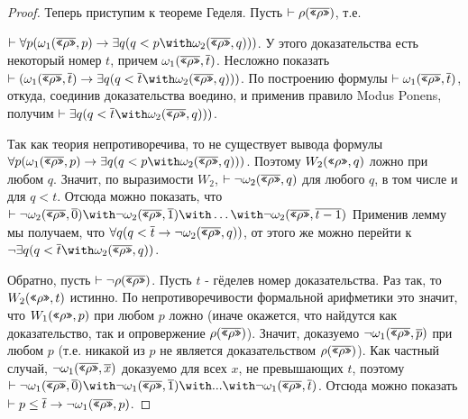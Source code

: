 \begin{proof}

Теперь приступим к теореме Геделя. Пусть $\vdash \rho(\overline{\texttt{<<}\rho\texttt{>>}})$, т.е.

$\vdash \forall p (\omega_1 (\overline{\gq\rho},p) \rightarrow \exists q (q < p \with \omega_2 (\overline{\gq\rho},q)))$.
У этого доказательства есть некоторый номер $t$, причем $\omega_1 (\overline{\texttt{<<}\rho\texttt{>>}},\overline{t})$.
Несложно показать $\vdash (\omega_1 (\overline{\gq\rho},\overline{t}) \rightarrow \exists q (q < \overline{t} \with \omega_2 (\overline{\gq\rho},q)))$.
По построению формулы $\vdash \omega_1 (\overline{\texttt{<<}\rho\texttt{>>}},\overline{t})$, откуда, соединив
доказательства воедино, и применив правило Modus Ponens, получим 
$\vdash \exists q (q < \overline{t} \with \omega_2 (\overline{\gq\rho},q)))$.

Так как теория непротиворечива, то не существует вывода формулы 
$\forall p (\omega_1 (\overline{\gq\rho},p) \rightarrow \exists q (q < p \with \omega_2 (\overline{\gq\rho},q)))$.
Поэтому $W_2 (\texttt{<<}\rho\texttt{>>}, q)$ ложно при любом $q$. Значит, по выразимости $W_2$, 
$\vdash \neg \omega_2 (\overline{\texttt{<<}\rho\texttt{>>}}, q)$ для любого $q$, в том числе и для $q < t$.
Отсюда можно показать, что 
$\vdash \neg \omega_2(\ogq{\rho},\overline{0}) \with \neg \omega_2(\ogq{\rho},\overline{1}) \with \dots \with \neg \omega_2(\ogq{\rho},\overline{t-1})$
Применив лемму мы получаем, что 
$\forall q (q < \overline{t} \rightarrow \neg \omega_2(\overline{\texttt{<<}\rho\texttt{>>}},q))$,
от этого же можно перейти к
$\neg \exists q (q < \overline{t} \with \omega_2(\ogq{\rho},q))$.

Обратно, пусть $\vdash \neg \rho(\overline{\texttt{<<}\rho\texttt{>>}})$. Пусть $t$ - гёделев номер доказательства.
Раз так, то $W_2 (\texttt{<<}\rho\texttt{>>},t)$ истинно. По непротиворечивости формальной арифметики
это значит, что $W_1 (\texttt{<<}\rho\texttt{>>},p)$ при любом $p$ ложно (иначе окажется, что 
найдутся как доказательство, так и опровержение $\rho(\overline{\texttt{<<}\rho\texttt{>>}})$). 
Значит, доказуемо $\neg \omega_1 (\overline{\texttt{<<}\rho\texttt{>>}},\overline{p})$ при 
любом $p$ (т.е. никакой из $p$ не является доказательством $\rho(\overline{\texttt{<<}\rho\texttt{>>}})$). 
Как частный случай, $\neg \omega_1 (\overline{\texttt{<<}\rho\texttt{>>}},\overline{x})$ доказуемо для
всех $x$, не превышающих $t$, поэтому 
$\vdash \neg \omega_1 (\ogq{\rho},\overline{0}) \with \neg \omega_1 (\ogq{\rho},\overline{1}) \with ... \with \neg \omega_1 (\ogq{\rho},\overline{t})$.
Отсюда можно показать $\vdash p \le \overline{t} \rightarrow \neg \omega_1 (\overline{\texttt{<<}\rho\texttt{>>}},p)$.


\end{proof}
